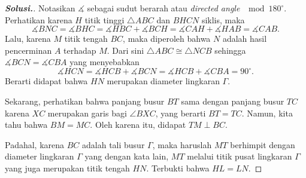 \begin{center}
\begin{tikzpicture}[line cap=round,line join=round,>=triangle 45,x=1cm,y=1cm,scale=0.55]
 \end{tikzpicture}
 \end{center}
 
  \begin{proof}[\textbf{Solusi.}]
  Notasikan $\measuredangle$ sebagai sudut berarah atau \textit{directed angle} $\mod 180^\circ$.
  Perhatikan karena $H$ titik tinggi $\triangle ABC$ dan $BHCN$ siklis, maka $$\measuredangle BNC = \measuredangle BHC = \measuredangle HBC + \measuredangle BCH = \measuredangle CAH + \measuredangle HAB = \measuredangle CAB.$$ Lalu, karena $M$ titik tengah $BC$, maka diperoleh bahwa $N$ adalah hasil pencerminan $A$ terhadap $M$. Dari sini $\triangle ABC \cong \triangle NCB$ sehingga $\measuredangle BCN = \measuredangle CBA$ yang menyebabkan
 $$\measuredangle HCN = \measuredangle HCB + \measuredangle BCN = \measuredangle HCB + \measuredangle CBA = 90^\circ.$$
 Berarti didapat bahwa $HN$ merupakan diameter lingkaran $\Gamma$. 
 
 Sekarang, perhatikan bahwa panjang  busur $BT$ sama dengan panjang busur $TC$ karena $XC$ merupakan garis bagi $\angle BXC$, yang berarti $BT=TC$. Namun, kita tahu bahwa $BM=MC$. Oleh karena itu, didapat $TM \perp BC$.
 
 Padahal, karena $BC$ adalah tali busur $\Gamma$, maka haruslah $MT$ berhimpit dengan diameter lingkaran $\Gamma$ yang dengan kata lain, $MT$ melalui titik pusat lingkaran $\Gamma$ yang juga merupakan titik tengah $HN$. Terbukti bahwa $HL = LN$.
 \end{proof}
